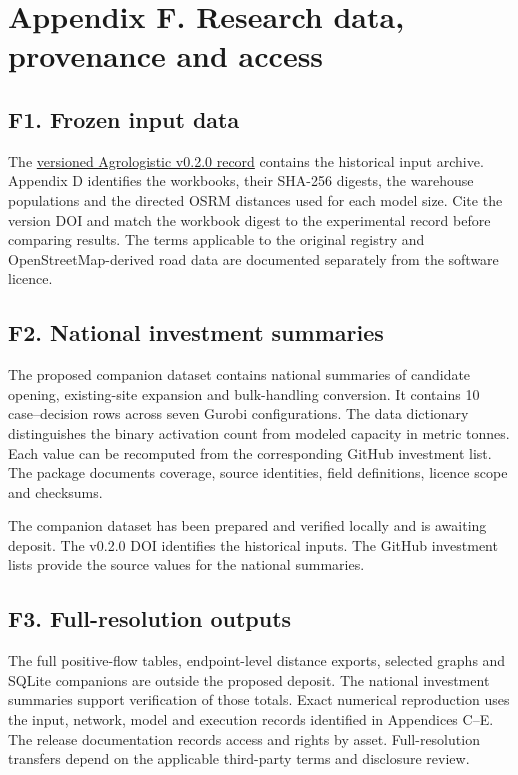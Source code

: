 \documentclass[
  english,
  11pt,
  a4paper,
]{article}
\begin{document}
\section{Appendix F. Research data, provenance and
access}\label{appendix-f.-research-data-provenance-and-access}

\subsection{F1. Frozen input data}\label{f1.-frozen-input-data}

The \href{https://doi.org/10.5281/zenodo.22751909}{versioned
Agrologistic v0.2.0 record} contains the historical input archive.
Appendix D identifies the workbooks, their SHA-256 digests, the
warehouse populations and the directed OSRM distances used for each
model size. Cite the version DOI and match the workbook digest to the
experimental record before comparing results. The terms applicable to
the original registry and OpenStreetMap-derived road data are documented
separately from the software licence.

\subsection{F2. National investment
summaries}\label{f2.-national-investment-summaries}

The proposed companion dataset contains national summaries of candidate
opening, existing-site expansion and bulk-handling conversion. It
contains 10 case--decision rows across seven Gurobi configurations. The
data dictionary distinguishes the binary activation count from modeled
capacity in metric tonnes. Each value can be recomputed from the
corresponding GitHub investment list. The package documents coverage,
source identities, field definitions, licence scope and checksums.

The companion dataset has been prepared and verified locally and is
awaiting deposit. The v0.2.0 DOI identifies the historical inputs. The
GitHub investment lists provide the source values for the national
summaries.

\subsection{F3. Full-resolution
outputs}\label{f3.-full-resolution-outputs}

The full positive-flow tables, endpoint-level distance exports, selected
graphs and SQLite companions are outside the proposed deposit. The
national investment summaries support verification of those totals.
Exact numerical reproduction uses the input, network, model and
execution records identified in Appendices C--E. The release
documentation records access and rights by asset. Full-resolution
transfers depend on the applicable third-party terms and disclosure
review.
\end{document}

